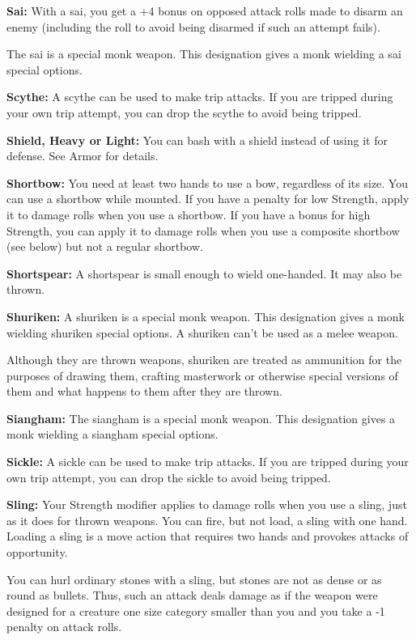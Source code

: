 \textbf{Sai:} With a sai, you get a +4 bonus on opposed attack rolls made to disarm 
an enemy (including the roll to avoid being disarmed if such an attempt fails).

The sai is a special monk weapon. This designation gives a monk wielding a sai 
special options.

\textbf{Scythe:} A scythe can be used to make trip attacks. If you are tripped 
during your own trip attempt, you can drop the scythe to avoid being tripped.

\textbf{Shield, Heavy or Light:} You can bash with a shield instead of using it 
for defense. See Armor for details.

\textbf{Shortbow:} You need at least two hands to use a bow, regardless of its 
size. You can use a shortbow while mounted. If you have a penalty for low Strength, 
apply it to damage rolls when you use a shortbow. If you have a bonus for high 
Strength, you can apply it to damage rolls when you use a composite shortbow (see 
below) but not a regular shortbow.

\textbf{Shortspear:} A shortspear is small enough to wield one-handed. It may also 
be thrown.

\textbf{Shuriken:} A shuriken is a special monk weapon. This designation gives 
a monk wielding shuriken special options. A shuriken can't be used as a melee weapon.

Although they are thrown weapons, shuriken are treated as ammunition for the purposes 
of drawing them, crafting masterwork or otherwise special versions of them and 
what happens to them after they are thrown.

\textbf{Siangham:} The siangham is a special monk weapon. This designation gives 
a monk wielding a siangham special options.

\textbf{Sickle:} A sickle can be used to make trip attacks. If you are tripped 
during your own trip attempt, you can drop the sickle to avoid being tripped.

\textbf{Sling:} Your Strength modifier applies to damage rolls when you use a sling, 
just as it does for thrown weapons. You can fire, but not load, a sling with one 
hand. Loading a sling is a move action that requires two hands and provokes attacks 
of opportunity.

You can hurl ordinary stones with a sling, but stones are not as dense or as round 
as bullets. Thus, such an attack deals damage as if the weapon were designed for 
a creature one size category smaller than you and you take a -1 penalty on attack 
rolls.

